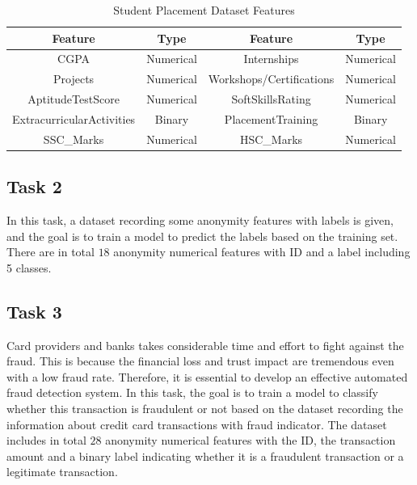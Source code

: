 \documentclass[11pt]{article}
\begin{document}
\begin{table}[H]
  \centering
  \begin{tabular}{|c|c|c|c|}
    \hline
    Feature                   & Type      & Feature                  & Type      \\
    \hline
    CGPA                      & Numerical & Internships              & Numerical \\
    \hline
    Projects                  & Numerical & Workshops/Certifications & Numerical \\
    \hline
    AptitudeTestScore         & Numerical & SoftSkillsRating         & Numerical \\
    \hline
    ExtracurricularActivities & Binary    & PlacementTraining        & Binary    \\
    \hline
    SSC\_Marks                & Numerical & HSC\_Marks               & Numerical \\
    \hline
  \end{tabular}
  \caption{Student Placement Dataset Features}
  \label{task-1-data}
\end{table}

\subsection{Task 2}

In this task, a dataset recording some anonymity features with labels is given, and the goal is to train a model to predict the labels based on the training set. There are in total $18$ anonymity numerical features with ID and a label including 5 classes.

\subsection{Task 3}

Card providers and banks takes considerable time and effort to fight against the fraud. This is because the financial loss and trust impact are tremendous even with a low fraud rate. Therefore, it is essential to develop an effective automated fraud detection system. In this task, the goal is to train a model to classify whether this transaction is fraudulent or not based on the dataset recording the information about credit card transactions with fraud indicator. The dataset includes in total $28$ anonymity numerical features with the ID, the transaction amount and a binary label indicating whether it is a fraudulent transaction or a legitimate transaction.
\end{document}
